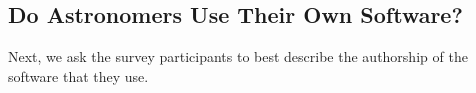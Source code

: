 \subsection{Do Astronomers Use Their Own Software?}

Next, we ask the survey participants to best describe the authorship of the software that they use. 